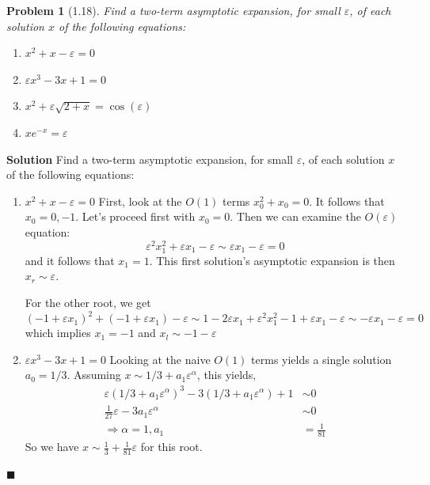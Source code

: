 \documentclass[11pt]{article}
\newcommand{\vep}{\varepsilon}
\theoremstyle{problemstyle}
\newtheorem{problem}{Problem}
\newenvironment{solution}
  {\noindent\textbf{Solution}\quad}
  {\hfill$\blacksquare$\par\vspace{1em}}
\begin{document}
\newpage
\begin{problem}[1.18]
  Find a two-term asymptotic expansion, for small $\vep$, of each solution $x$ of the
  following equations:
  \begin{enumerate}
    \item $x^2 + x - \vep = 0$
    \item[(e)] $\vep x^3 -3x + 1 = 0$
    \item[(h)] $x^2 + \vep \sqrt{2+x} = \cos(\vep)$
    \item[(p)] $xe^{-x} = \vep$
  \end{enumerate}
\end{problem}

\begin{solution}
  Find a two-term asymptotic expansion, for small $\vep$, of each solution $x$ of the
  following equations:
  \begin{enumerate}
    \item $x^2 + x - \vep = 0$
      \newline
      First, look at the $O(1)$ terms $x_0^2 + x_0 = 0$. It follows that $x_0 =
      0,-1$. Let's proceed first with $x_0 = 0$. Then we can examine the
      $O(\vep)$ equation:
      \[\vep^2 x_1^2 + \vep x_1 - \vep \sim \vep x_1 - \vep = 0 \]
      and it follows that $x_1 = 1$. This first solution's asymptotic expansion
      is then $x_r \sim \vep$.

      For the other root, we get
      \[
        (-1 + \vep x_1)^2 + (-1 + \vep x_1) - \vep \sim 1 - 2\vep x_1 + \vep^2
        x_1^2 - 1 + \vep x_1
        - \vep \sim -\vep x_1 - \vep = 0
      \]
      which implies $x_1 = - 1$ and $x_l \sim - 1 - \vep$
    \item[(e)] $\vep x^3 -3x + 1 = 0$
      \newline
      Looking at the naive $O(1)$ terms yields a single solution $a_0 = 1/3$.
      Assuming $x \sim 1/3 + a_1 \vep^\alpha$, this yields,
      \begin{align*}
        \vep(1/3 + a_1 \vep^\alpha)^3 - 3(1/3 + a_1 \vep^\alpha) + 1 & \sim 0 \\
        \frac{1}{27}\vep - 3a_1\vep^\alpha & \sim 0 \\
        \Rightarrow \alpha = 1, a_1 & = \frac{1}{81}
      \end{align*}
      So we have $x \sim \frac{1}{3} + \frac{1}{81} \vep$ for this root.


\end{enumerate}
\end{solution}
\end{document}
